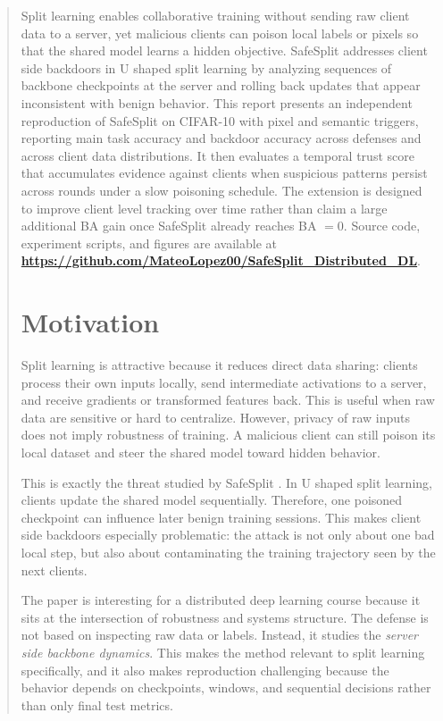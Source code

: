 \documentclass{article}
\begin{document}
\begin{abstract}
Split learning enables collaborative training without sending raw client data to a server, yet malicious clients can poison local labels or pixels so that the shared model learns a hidden objective. SafeSplit addresses client side backdoors in U shaped split learning by analyzing sequences of backbone checkpoints at the server and rolling back updates that appear inconsistent with benign behavior. This report presents an independent reproduction of SafeSplit on CIFAR-10 with pixel and semantic triggers, reporting main task accuracy and backdoor accuracy across defenses and across client data distributions. It then evaluates a temporal trust score that accumulates evidence against clients when suspicious patterns persist across rounds under a slow poisoning schedule. The extension is designed to improve client level tracking over time rather than claim a large additional BA gain once SafeSplit already reaches BA $=0$. Source code, experiment scripts, and figures are available at \href{https://github.com/MateoLopez00/SafeSplit_Distributed_DL}{\textbf{\url{https://github.com/MateoLopez00/SafeSplit_Distributed_DL}}}.

\vskip 0.2in

\section{Motivation}
\label{sec:motivation}

Split learning is attractive because it reduces direct data sharing: clients process their own inputs locally, send intermediate activations to a server, and receive gradients or transformed features back. This is useful when raw data are sensitive or hard to centralize. However, privacy of raw inputs does not imply robustness of training. A malicious client can still poison its local dataset and steer the shared model toward hidden behavior.

This is exactly the threat studied by SafeSplit \cite{safesplit2025}. In U shaped split learning, clients update the shared model sequentially. Therefore, one poisoned checkpoint can influence later benign training sessions. This makes client side backdoors especially problematic: the attack is not only about one bad local step, but also about contaminating the training trajectory seen by the next clients.

The paper is interesting for a distributed deep learning course because it sits at the intersection of robustness and systems structure. The defense is not based on inspecting raw data or labels. Instead, it studies the \emph{server side backbone dynamics}. This makes the method relevant to split learning specifically, and it also makes reproduction challenging because the behavior depends on checkpoints, windows, and sequential decisions rather than only final test metrics.


\end{abstract}
\end{document}
